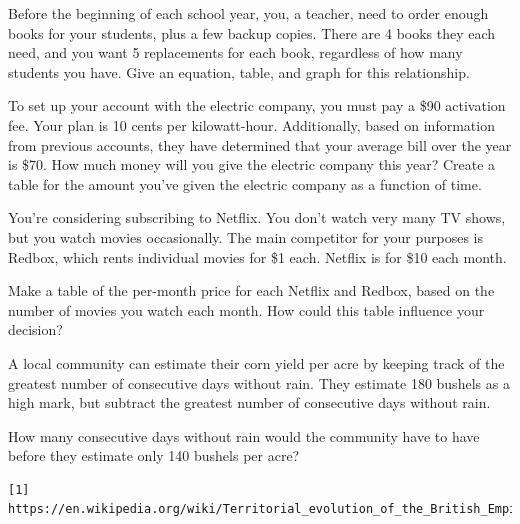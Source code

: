 \begin{exercise}
Before the beginning of each school year, you, a teacher, need to order enough books for your students, plus a few backup copies.  There are 4 books they each need, and you want 5 replacements for each book, regardless of how many students you have.  Give an equation, table, and graph for this relationship.
\end{exercise}
\bigskip

\begin{exercise}
To set up your account with the electric company, you must pay a \$90 activation fee.  Your plan is 10 cents per kilowatt-hour.  Additionally, based on information from previous accounts, they have determined that your average bill over the year is \$70.  How much money will you give the electric company this year?  Create a table for the amount you've given the electric company as a function of time.
\end{exercise}

\begin{exercise}
You're considering subscribing to Netflix.  You don't watch very many TV shows, but you watch movies occasionally.  The main competitor for your purposes is Redbox, which rents individual movies for \$1 each.  Netflix is for \$10 each month.

Make a table of the per-month price for each Netflix and Redbox, based on the number of movies you watch each month.  How could this table influence your decision?

\end{exercise}

\begin{exercise}
A local community can estimate their corn yield per acre by keeping track of the greatest number of consecutive days without rain.  They estimate 180 bushels as a high mark, but subtract the greatest number of consecutive days without rain.

How many consecutive days without rain would the community have to have before they estimate only 140 bushels per acre?
\end{exercise}

\begin{verbatim}
[1] https://en.wikipedia.org/wiki/Territorial_evolution_of_the_British_Empire#/media/File:Riseandfall1.PNG
\end{verbatim}